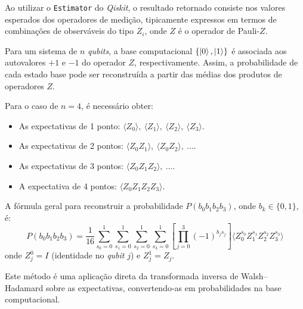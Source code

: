 \label{ap: apendiceB}

Ao utilizar o \texttt{Estimator} do \textit{Qiskit}, o resultado retornado consiste nos valores esperados dos operadores de medição, tipicamente expressos em termos de combinações de observáveis do tipo $Z_i$, onde $Z$ é o operador de Pauli-$Z$. 

Para um sistema de $n$ \textit{qubits}, a base computacional $\{\ket{0}, \ket{1}\}$ é associada aos autovalores $+1$ e $-1$ do operador $Z$, respectivamente. Assim, a probabilidade de cada estado base pode ser reconstruída a partir das médias dos produtos de operadores $Z$.

Para o caso de $n=4$, é necessário obter:
\begin{itemize}
    \item As expectativas de 1 ponto: $\langle Z_0 \rangle, ~\langle Z_1 \rangle,~ \langle Z_2 \rangle,~ \langle Z_3 \rangle$.
    \item As expectativas de 2 pontos: $\langle Z_0 Z_1 \rangle,~ \langle Z_0 Z_2 \rangle,~ \dots$.
    \item As expectativas de 3 pontos: $\langle Z_0 Z_1 Z_2 \rangle,~ \dots$.
    \item A expectativa de 4 pontos: $\langle Z_0 Z_1 Z_2 Z_3 \rangle$.
\end{itemize}

A fórmula geral para reconstruir a probabilidade $P(b_0 b_1 b_2 b_3)$, onde $b_k \in \{0,1\}$, é:
\begin{equation}
P(b_0 b_1 b_2 b_3) = \frac{1}{16} \sum_{s_0=0}^1 \sum_{s_1=0}^1 \sum_{s_2=0}^1 \sum_{s_3=0}^1 
\left[ \prod_{j=0}^3 (-1)^{b_j s_j} \right] \langle Z_0^{s_0} Z_1^{s_1} Z_2^{s_2} Z_3^{s_3} \rangle
\end{equation}
onde $Z_j^0 = I$ (identidade no \textit{qubit} $j$) e $Z_j^1 = Z_j$.

Este método é uma aplicação direta da transformada inversa de Walsh–Hadamard sobre as expectativas, convertendo-as em probabilidades na base computacional.
